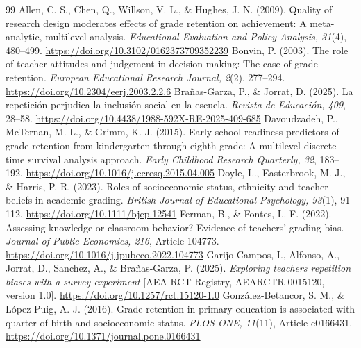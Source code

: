 \begin{thebibliography}{99}\small{}\setlength{\itemsep}{5pt}
 \color{reused} Allen, C. S., Chen, Q., Willson, V. L., \& Hughes, J. N. (2009). Quality of research design moderates effects of grade retention on achievement: A meta-analytic, multilevel analysis. \textit{Educational Evaluation and Policy Analysis, 31}(4), 480--499. \url{https://doi.org/10.3102/0162373709352239}
 \color{reused} Bonvin, P. (2003). The role of teacher attitudes and judgement in decision-making: The case of grade retention. \textit{European Educational Research Journal, 2}(2), 277--294. \url{https://doi.org/10.2304/eerj.2003.2.2.6}
 Bra\~nas-Garza, P., \& Jorrat, D. (2025). La repetici\'on perjudica la inclusi\'on social en la escuela. \textit{Revista de Educaci\'on, 409}, 28--58. \url{https://doi.org/10.4438/1988-592X-RE-2025-409-685}
 \color{reused} Davoudzadeh, P., McTernan, M. L., \& Grimm, K. J. (2015). Early school readiness predictors of grade retention from kindergarten through eighth grade: A multilevel discrete-time survival analysis approach. \textit{Early Childhood Research Quarterly, 32}, 183--192. \url{https://doi.org/10.1016/j.ecresq.2015.04.005}
 Doyle, L., Easterbrook, M. J., \& Harris, P. R. (2023). Roles of socioeconomic status, ethnicity and teacher beliefs in academic grading. \textit{British Journal of Educational Psychology, 93}(1), 91--112. \url{https://doi.org/10.1111/bjep.12541}
 Ferman, B., \& Fontes, L. F. (2022). Assessing knowledge or classroom behavior? Evidence of teachers' grading bias. \textit{Journal of Public Economics, 216}, Article 104773. \url{https://doi.org/10.1016/j.jpubeco.2022.104773}
 \color{reused} Garijo-Campos, I., Alfonso, A., Jorrat, D., Sanchez, A., \& Bra\~nas-Garza, P. (2025). \textit{Exploring teachers repetition biases with a survey experiment} [AEA RCT Registry, AEARCTR-0015120, version 1.0]. \url{https://doi.org/10.1257/rct.15120-1.0}
 \color{reused} Gonz\'alez-Betancor, S. M., \& L\'opez-Puig, A. J. (2016). Grade retention in primary education is associated with quarter of birth and socioeconomic status. \textit{PLOS ONE, 11}(11), Article e0166431. \url{https://doi.org/10.1371/journal.pone.0166431}

\end{thebibliography}
